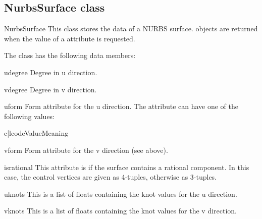 \subsection{NurbsSurface class}
\label{nurbssurface}

\begin{classdesc*}{NurbsSurface}
This class stores the data of a NURBS surface.  objects
are returned when the value of a  attribute is requested.
\end{classdesc*}

The class has the following data members:

\begin{memberdesc}{udegree}
Degree in u direction.
\end{memberdesc}

\begin{memberdesc}{vdegree}
Degree in v direction.
\end{memberdesc}

\begin{memberdesc}{uform}
Form attribute for the u direction. The attribute can have one of the 
following values:

\begin{tableii}{c|l}{code}{Value}{Meaning}
\end{tableii}
\end{memberdesc}

\begin{memberdesc}{vform}
Form attribute for the v direction (see above).
\end{memberdesc}

\begin{memberdesc}{isrational}
This attribute is  if the surface contains a rational component.
In this case, the control vertices are given as 4-tuples, otherwise
as 3-tuples. 
\end{memberdesc}

\begin{memberdesc}{uknots}
This is a list of floats containing the knot values for the u direction.
\end{memberdesc}

\begin{memberdesc}{vknots}
This is a list of floats containing the knot values for the v direction.
\end{memberdesc}

